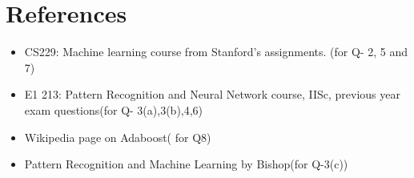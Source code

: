 \section*{References}

\begin{itemize}
    \item CS229: Machine learning course from Stanford's assignments. (for Q- 2, 5 and 7)
    \item E1 213: Pattern Recognition and Neural Network course, IISc, previous year exam questions(for Q- 3(a),3(b),4,6)
    \item Wikipedia page on Adaboost( for Q8)
    \item Pattern Recognition and Machine Learning by Bishop(for Q-3(c))
\end{itemize}
